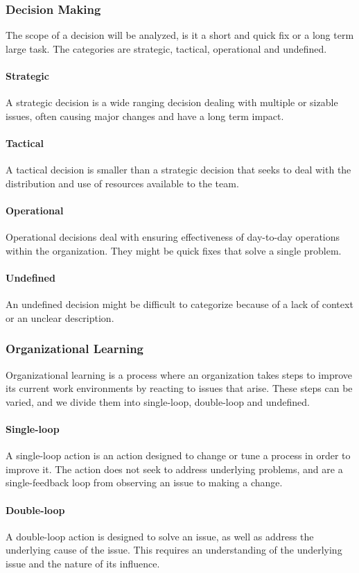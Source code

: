 \subsubsection{Decision Making}
The scope of a decision will be analyzed, is it a short and quick fix or a long term large task. The categories are strategic, tactical, operational and undefined. 
\paragraph{Strategic}
A strategic decision is a wide ranging decision dealing with multiple or sizable issues, often causing major changes and have a long term impact. 
\paragraph{Tactical}
A tactical decision is smaller than a strategic decision that seeks to deal with the distribution and use of resources available to the team. 
\paragraph{Operational}
Operational decisions deal with ensuring effectiveness of day-to-day operations within the organization. They might be quick fixes that solve a single problem.
\paragraph{Undefined}
An undefined decision might be difficult to categorize because of a lack of context or an unclear description. 
\subsubsection{Organizational Learning}
Organizational learning is a process where an organization takes steps to improve its current work environments by reacting to issues that arise. These steps can be varied, and we divide them into single-loop, double-loop and undefined. 
\paragraph{Single-loop}
A single-loop action is an action designed to change or tune a process in order to improve it. The action does not seek to address underlying problems, and are a single-feedback loop from observing an issue to making a change.
\paragraph{Double-loop}
A double-loop action is designed to solve an issue, as well as address the underlying cause of the issue. This requires an understanding of the underlying issue and the nature of its influence. 
